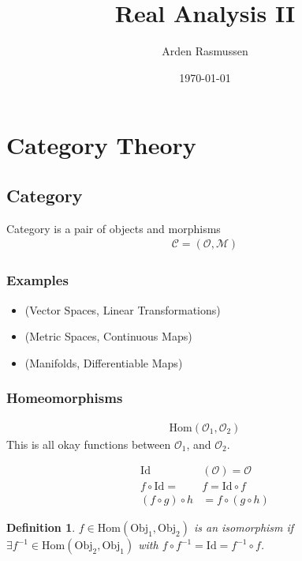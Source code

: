 \documentclass[10pt]{amsart}
\title{Real Analysis II}
\author{Arden Rasmussen}
\date{\today}
\newtheorem{definition}{Definition}[section]
\renewcommand{\hom}{\text{Hom}}
\newcommand{\id}{\text{Id}}
\newcommand{\C}{\mathcal{C}}
\newcommand{\ob}{\mathcal{O}}
\newcommand{\obj}{\text{Obj}}
\newcommand{\M}{\mathcal{M}}
\renewcommand{\o}{\circ}
\renewcommand{\i}{^{-1}}
\renewcommand{\*}{\star}
\begin{document}
\maketitle

\section{Category Theory}%
\label{sec:category_theory}

\subsection{Category}%
\label{sub:category}

Category is a pair of objects and morphisms
\begin{align*}
  \C=(\ob,\M)
\end{align*}

\subsubsection{Examples}%
\label{ssub:examples}

\begin{itemize}
  \item (Vector Spaces, Linear Transformations)
  \item (Metric Spaces, Continuous Maps)
  \item (Manifolds, Differentiable Maps)
\end{itemize}

\subsubsection{Homeomorphisms}%
\label{ssub:homeomorphisms}

\begin{align*}
  \hom(\ob_1,\ob_2)
\end{align*}
This is all okay functions between $\ob_1$, and $\ob_2$.

\begin{align*}
  \id&(\ob)=\ob\\
  f\o\id=&f=\id\o f\\
  \left(f\o g\right)\o h&=f\o\left(g\o h\right)
\end{align*}

\begin{definition}
  $f\in\hom\left(\obj_1,\obj_2\right)$ is an \textit{isomorphism} if $\exists
    f\i\in\hom\left(\obj_2,\obj_1\right)$ with $f\o f\i=\id=f\i\o f$.
\end{definition}
\end{document}
